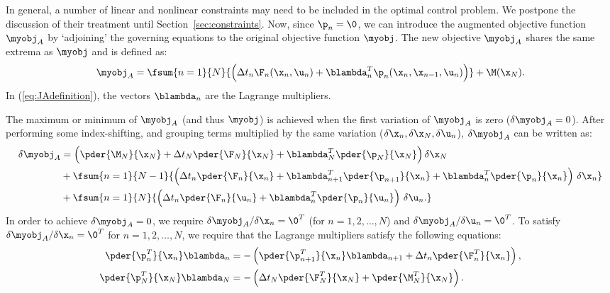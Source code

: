 In general, a number of linear and nonlinear constraints may need to be included in the optimal
control problem. We postpone the discussion of their treatment until Section~\ref{sec:constraints}. 
Now, since $\p_n = \0$, we can introduce the augmented objective function $\myobj_A$ by `adjoining' 
the governing equations to the original objective function $\myobj$. The new objective $\myobj_A$ shares
the same extrema as $\myobj$ and is defined as:
%
\begin{align}
\label{eq:JAdefinition}
  \myobj_A = \fsum{n=1}{N}{\left ( \Delta t_n \F_n(\x_n, \u_n)
      + \blambda^T_n \p_n (\x_n, \x_{n-1}, \u_n)  \right )}
   + \M(\x_N).
\end{align}
%
In (\ref{eq:JAdefinition}), the vectors $\blambda_n$ are the Lagrange multipliers.


The maximum or minimum of $\myobj_A$ (and thus $\myobj$) is achieved when the first variation of $\myobj_A$ is 
zero ($\delta \myobj_A=0$). After performing some index-shifting, and grouping
terms multiplied by the same variation ($\delta \x_n, \delta \x_N,
\delta \u_n$), $\delta \myobj_A$ can be written as:
%
\begin{align}
\label{eq:discreteAfterRegrouping}
  \delta \myobj_A &=
  \left (
    \pder{\M_N}{\x_N}
    + \Delta t_N \pder{\F_N}{\x_N}
    + \blambda_N^T\pder{\p_N}{\x_N}
    \right ) \delta \x_N
    \nonumber \\
    &+\fsum{n=1}{N-1}{
      \left (
        \Delta t_n \pder{ \F_n}{\x_n}
        +\blambda^T_{n+1}\pder{\p_{n+1}}{\x_n}
        +\blambda^T_n\pder{\p_n}{\x_n}
      \right ) \, \delta \x_n
    } \nonumber \\
    &+\fsum{n=1}{N}{
      \left (
        \Delta t_n \pder{\F_n}{\u_n}
        +\blambda^T_n\pder{\p_n}{\u_n}
      \right ) \, \delta \u_n.
    }
\end{align}
%
In order to achieve $\delta \myobj_A=0$, we require $\delta \myobj_A / \delta \x_n=\0^T$ (for $n=1,2, \ldots, N$) and $\delta \myobj_A / \delta \u_n=\0^T$. To satisfy $\delta \myobj_A / \delta \x_n =\0^T$ for $n=1,2, \ldots, N$, we require that the Lagrange multipliers satisfy the following equations:
%
\begin{align}
\label{eq:discreteODE}
 \pder{\p_n^T}{\x_n}  \blambda_n &= -
 \left (\pder{\p_{n+1}^T}{\x_n} \blambda_{n+1} + \Delta t_n \pder{\F^T_n}{\x_n}
 \right ),%
\\
\label{eq:discreteBC}
  \pder{\p_N^T}{\x_N} \blambda_N &= -
  \left ( \Delta t_N \pder{\F^T_N}{\x_N} + \pder{\M_N^T}{\x_N} \right ).
\end{align}
